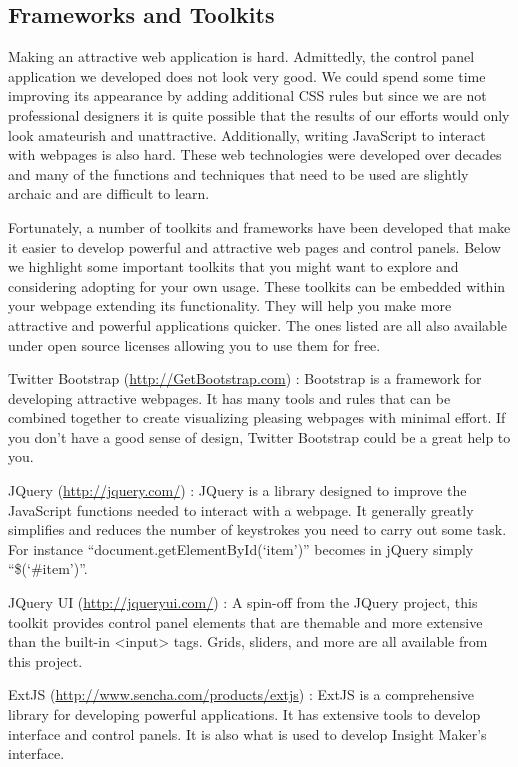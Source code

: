 \documentclass[]{memoir}
\begin{document}
\subsection{Frameworks and Toolkits}

Making an attractive web application is hard. Admittedly, the control
panel application we developed does not look very good. We could spend
some time improving its appearance by adding additional CSS rules but
since we are not professional designers it is quite possible that the
results of our efforts would only look amateurish and unattractive.
Additionally, writing JavaScript to interact with webpages is also hard.
These web technologies were developed over decades and many of the
functions and techniques that need to be used are slightly archaic and
are difficult to learn.

Fortunately, a number of toolkits and frameworks have been developed
that make it easier to develop powerful and attractive web pages and
control panels. Below we highlight some important toolkits that you
might want to explore and considering adopting for your own usage. These
toolkits can be embedded within your webpage extending its
functionality. They will help you make more attractive and powerful
applications quicker. The ones listed are all also available under open
source licenses allowing you to use them for free.

Twitter Bootstrap (\url{http://GetBootstrap.com}) : Bootstrap is a
framework for developing attractive webpages. It has many tools and
rules that can be combined together to create visualizing pleasing
webpages with minimal effort. If you don't have a good sense of design,
Twitter Bootstrap could be a great help to you.

JQuery (\url{http://jquery.com/}) : JQuery is a library designed to
improve the JavaScript functions needed to interact with a webpage. It
generally greatly simplifies and reduces the number of keystrokes you
need to carry out some task. For instance
``document.getElementById(`item')'' becomes in jQuery simply
``\$(`\#item')''.

JQuery UI (\url{http://jqueryui.com/}) : A spin-off from the JQuery
project, this toolkit provides control panel elements that are themable
and more extensive than the built-in \textless{}input\textgreater{}
tags. Grids, sliders, and more are all available from this project.

ExtJS (\url{http://www.sencha.com/products/extjs}) : ExtJS is a
comprehensive library for developing powerful applications. It has
extensive tools to develop interface and control panels. It is also what
is used to develop Insight Maker's interface.
\end{document}
